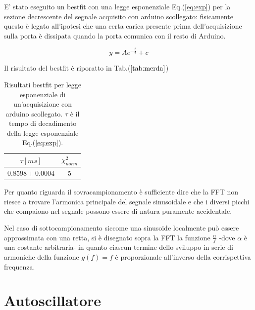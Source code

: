 \documentclass{article}
\begin{document}
    E' stato eseguito un bestfit con una legge esponenziale Eq.(\ref{eq:exp}) per la sezione decrescente
    del segnale acquisito con arduino scollegato: fisicamente questo è legato all'ipotesi 
    che una certa carica presente prima dell'acquisizione 
    sulla porta è dissipata quando la porta comunica con il resto di Arduino.
    
        \begin{equation}
            y=A e^{-\frac{t}{\tau}}+c
            \label{eq:exp}
        \end{equation}
    
    Il risultato del bestfit è riporatto in Tab.($\ref{tab:merda}$)
    

        \begin{table}[H]
            \centering
            \begin{tabular}{cc}
                $\tau[ms]$ & $\chi^2_{norm}$\\
                \hline
                $0.8598\pm0.0004$ &$5$\\
            \end{tabular}
        \caption{Risultati bestfit per legge esponenziale di un'acquisizione 
                con arduino scollegato. $\tau$ è il tempo di decadimento della legge 
                esponenziale Eq.(\ref{eq:exp}).}
        \label{tab:merda}
        \end{table}



    Per quanto riguarda il sovracampionamento è sufficiente dire che la 
    FFT non riesce a trovare l'armonica principale del segnale sinusoidale e 
    che i diversi picchi che compaiono nel segnale possono essere di natura puramente
    accidentale.

    Nel caso di sottocampionamento siccome una sinusoide localmente può 
    essere approssimata con una retta, si è disegnato sopra la FFT la funzione
    $\frac{\alpha}{f}$ -dove $\alpha$ è una costante arbitraria-
    in quanto ciascun termine dello sviluppo in serie  di 
    armoniche della funzione $g(f)=f$ è proporzionale all'inverso della 
    corrispettiva frequenza.







\section{Autoscillatore}
\end{document}
